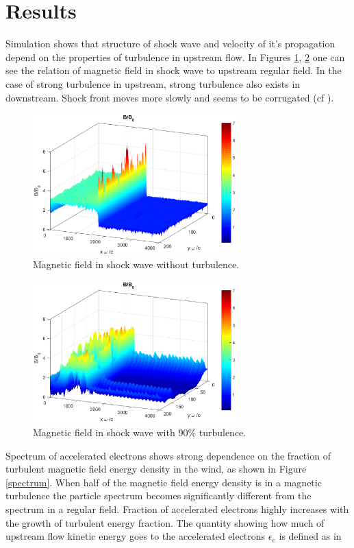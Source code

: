 \documentclass[a4paper]{jpconf}
\begin{document}
\section{Results}
Simulation shows that structure of shock wave and velocity of it's propagation depend on the properties of turbulence in upstream flow. In Figures \ref{regularB}, \ref{turbulentB} one can see the relation of magnetic field in shock wave to upstream regular field. In the case of strong turbulence in upstream, strong turbulence also exists in downstream. Shock front moves more slowly and seems to be corrugated (cf \cite{2016ApJ...827...44L}).

\begin{figure}[h!]
		\centering
		\includegraphics[width=0.7\textwidth]{fig/regular_field.eps} 
		\caption{Magnetic field in shock wave without turbulence.}
		\label{regularB}
\end{figure}
\begin{figure}[h!]
		\centering
		\includegraphics[width=0.7\textwidth]{fig/turbulent_field.eps} 
		\caption{Magnetic field in shock wave with 90\% turbulence.}
		\label{turbulentB}
\end{figure}
Spectrum of accelerated electrons shows strong dependence on the fraction of turbulent magnetic field energy density in the wind, as shown in Figure \ref{spectrum}. When half of the magnetic field energy density is in a magnetic turbulence the particle spectrum becomes significantly different from the spectrum in a regular field. Fraction of accelerated electrons highly increases with the growth of turbulent energy fraction. The quantity showing how much of upstream flow kinetic energy goes to the accelerated electrons $\epsilon_e$ is defined as in \cite{Crumley2019}
\end{document}
